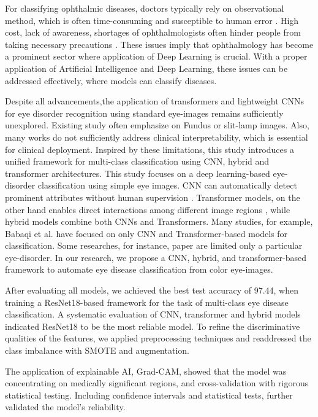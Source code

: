 \documentclass[conference,9pt]{IEEEtran}
\begin{document}
For classifying ophthalmic diseases, doctors typically rely on observational method, which is often time-consuming and susceptible to human error \cite{11}. High cost, lack of awareness, shortages of ophthalmologists often hinder people from taking necessary precautions \cite{9}. These issues imply that ophthalmology has become a prominent sector where application of Deep Learning is crucial. With a proper application of Artificial Intelligence and Deep Learning, these issues can be addressed effectively, where models can classify diseases.

Despite all advancements,the application of transformers and lightweight CNNs for eye disorder recognition using standard eye-images remains sufficiently unexplored. Existing study often emphasize on Fundus or slit-lamp images. Also, many works do not sufficiently address clinical interpretability, which is essential for clinical deployment. Inspired by these limitations, this study introduces a unified framework for multi-class classification using CNN, hybrid and transformer architectures. This study focuses on a deep learning-based eye-disorder classification using simple eye images. CNN can automatically detect prominent attributes without human supervision \cite{12}. Transformer models, on the other hand enables direct interactions among different image regions \cite{13}, while hybrid models combine both CNNs and Transformers. Many studies, for example, Babaqi et al. \cite{9} have focused on only CNN and Transformer-based models for classification. Some researches, for instance, paper \cite{18} are limited only a particular eye-disorder. In our research, we propose a CNN, hybrid, and transformer-based framework to automate eye disease classification from color eye-images.

After evaluating all models, we achieved the best test accuracy of 97.44, when training a ResNet18-based framework for the task of multi-class eye disease classification. A systematic evaluation of CNN, transformer and hybrid models indicated ResNet18 to be the most reliable model. To refine the discriminative qualities of the features, we applied preprocessing techniques and readdressed the class imbalance with SMOTE and augmentation. 

The application of explainable AI, Grad-CAM, showed that the model was concentrating on medically significant regions, and cross-validation with rigorous statistical testing. Including confidence intervals and statistical tests, further validated the model's reliability.
\end{document}
